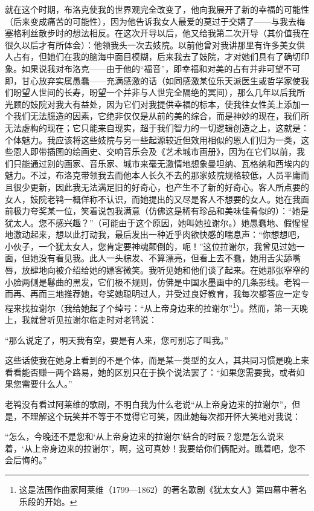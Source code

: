 \par 就在这个时期，布洛克使我的世界观完全改变了，他向我展开了新的幸福的可能性（后来变成痛苦的可能性），因为他告诉我女人最爱的莫过于交媾了——与我去梅塞格利丝散步时的想法相反。在这次开导以后，他又给我第二次开导（其价值我在很久以后才有所体会）：他领我头一次去妓院。以前他曾对我讲那里有许多美女供人占有，但她们在我的脑海中面目模糊，后来我去了妓院，才对她们具有了确切印象。如果说我对布洛克——由于他的“福音”，即幸福和对美的占有并非可望不可即，甘心放弃实属愚蠢——充满感激的话（如同感激某位乐天派医生或哲学家使我们盼望人世间的长寿，盼望一个并非与人世完全隔绝的冥间），那么几年以后我所光顾的妓院对我大有益处，因为它们对我提供幸福的标本，使我往女性美上添加一个我们无法臆造的因素，它绝非仅仅是从前的美的综合，而是神妙的现在，我们所无法虚构的现在；它只能来自现实，超于我们智力的一切逻辑创造之上，这就是：个体魅力。我应该将这些妓院与另一些起源较近但效用相似的恩人们归为一类，这些恩人即带插图的绘画史、交响音乐会及《艺术城市画册》，因为在它们以前，我们只能通过别的画家、音乐家、城市来毫无激情地想象曼坦纳、瓦格纳和西埃内的魅力。不过，布洛克带领我去而他本人长久不去的那家妓院规格较低，人员平庸而且很少更新，因此我无法满足旧的好奇心，也产生不了新的好奇心。客人所点要的女人，妓院老鸨一概佯称不认识，而她提出的又尽是客人不想要的女人。她在我面前极力夸奖某一位，笑着说包我满意（仿佛这是稀有珍品和美味佳肴似的）：“她是犹太人。您不感兴趣？”（可能由于这个原因，她叫她拉谢尔。）她愚蠢地、假惺惺地激动起来，想以此打动我，最后发出一种近乎肉欲快感的喘息声：“你想想吧，小伙子，一个犹太女人，您肯定要神魂颠倒的，呃！”这位拉谢尔，我曾见过她一面，但她没有看见我。此人一头棕发、不算漂亮，但看上去不蠢，她用舌尖舔嘴唇，放肆地向被介绍给她的嫖客微笑。我听见她和他们谈了起来。在她那张窄窄的小脸两侧是鬈曲的黑发，它们极不规则，仿佛是中国水墨画中的几条影线。老鸨一而再、再而三地推荐她，夸奖她聪明过人，并受过良好教育，我每次都答应一定专程来找拉谢尔（我给她起了个绰号：“从上帝身边来的拉谢尔”\footnote{这是法国作曲家阿莱维（1799—1862）的著名歌剧《犹太女人》第四幕中著名乐段的开始。}）。然而，第一天晚上，我就曾听见拉谢尔临走时对老鸨说：
\par “那么说定了，明天我有空，要是有人来，您可别忘了叫我。”
\par 这些话使我在她身上看到的不是个体，而是某一类型的女人，其共同习惯是晚上来看看能否赚一两个路易，她的区别只在于换个说法罢了：“如果您需要我，或者如果您需要什么人。”
\par 老鸨没有看过阿莱维的歌剧，不明白我为什么老说“从上帝身边来的拉谢尔”，但是，不理解这个玩笑并不等于不觉得它可笑，因此她每次都开怀大笑地对我说：
\par “怎么，今晚还不是您和‘从上帝身边来的拉谢尔’结合的时辰？您是怎么说来着，‘从上帝身边来的拉谢尔’，啊，这可真妙！我要给你们俩配对。瞧着吧，您不会后悔的。”
